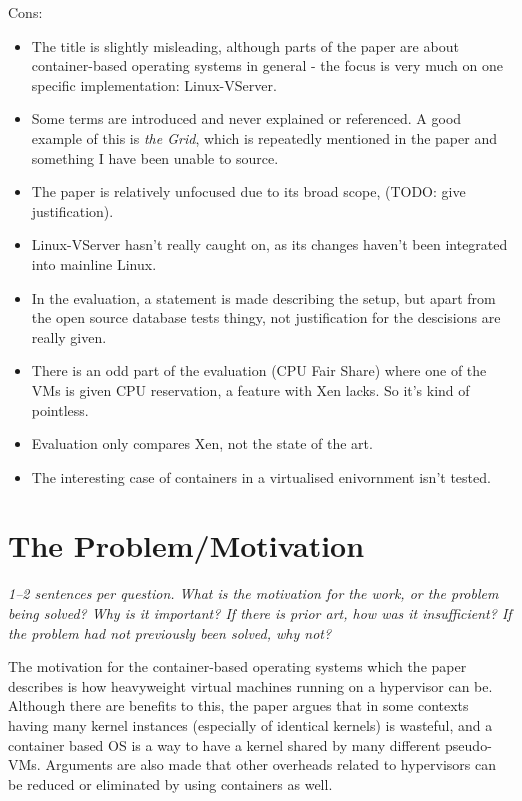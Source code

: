 \documentclass[11pt]{article}
\begin{document}
Cons:

\begin{itemize}

    \item The title is slightly misleading, although parts of the paper are
    about container-based operating systems in general - the focus is very much
    on one specific implementation: Linux-VServer.

    \item Some terms are introduced and never explained or referenced. A good
    example of this is \textit{the Grid}, which is repeatedly mentioned in the
    paper and something I have been unable to source.

    \item The paper is relatively unfocused due to its broad scope, (TODO: give
    justification).

    \item Linux-VServer hasn't really caught on, as its changes haven't been
    integrated into mainline
    Linux.

    \item In the evaluation, a statement is made describing the setup, but
    apart from the open source database tests thingy, not justification for the
    descisions are really given.

    \item There is an odd part of the evaluation (CPU Fair Share) where one of the
    VMs is given CPU reservation, a feature with Xen lacks. So it's kind of pointless.

    \item Evaluation only compares Xen, not the state of the art.

    \item The interesting case of containers in a virtualised enivornment isn't
    tested.

\end{itemize}

\section*{The Problem/Motivation}

\textsl{1--2 sentences per question. What is the motivation for the work, or
the problem being solved? Why is it important? If there is prior art, how was
it insufficient? If the problem had not previously been solved, why not?}

The motivation for the container-based operating systems which the paper
describes is how heavyweight virtual machines running on a hypervisor can be.
Although there are benefits to this, the paper argues that in some contexts
having many kernel instances (especially of identical kernels) is wasteful, and
a container based OS is a way to have a kernel shared by many different
pseudo-VMs. Arguments are also made that other overheads related to hypervisors
can be reduced or eliminated by using containers as well.
\end{document}
